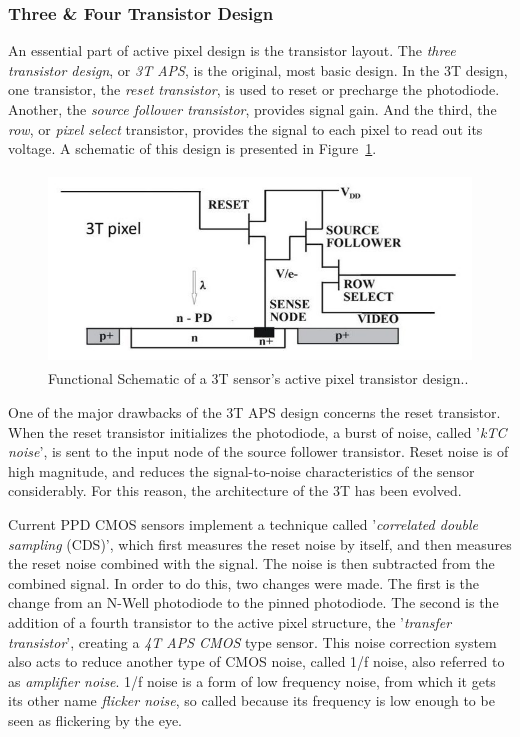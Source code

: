 \documentclass[10pt]{article}
\begin{document}
\subsubsection{Three \& Four Transistor Design}
\label{sec:3T4T}

An essential part of active pixel design is the transistor layout. The \emph{three transistor design}, or \emph{3T APS}, is the original, most basic design.  In the 3T design, one transistor, the \emph{reset transistor}, is used to reset or precharge the photodiode. Another, the \emph{source follower transistor}, provides signal gain. And the third, the \emph{row}, or \emph{pixel select} transistor, provides the signal to each pixel to read out its voltage. A schematic of this design is presented in Figure~\ref{fig:3TSchematic}.

\begin{figure}[!t]
    \centering
        \includegraphics[height=2in]{3T CMOS Design.png}
    \caption{Functional Schematic of a 3T sensor's active pixel transistor design.\cite{website:EDN0120}.}
    \label{fig:3TSchematic}
\end{figure}


One of the major drawbacks of the 3T APS design concerns the reset transistor. When the reset transistor initializes the photodiode, a burst of noise, called '\emph{kTC noise}', is sent to the input node of the source follower transistor. Reset noise is of high magnitude, and reduces the signal-to-noise characteristics of the sensor considerably. For this reason, the architecture of the 3T has been evolved.

Current PPD CMOS sensors implement a technique called '\emph{correlated double sampling} (CDS)', which first measures the reset noise by itself, and then measures the reset noise combined with the signal. The noise is then subtracted from the combined signal. In order to do this, two changes were made. The first is the change from an N-Well photodiode to the pinned photodiode. The second is the addition of a fourth transistor to the active pixel structure, the '\emph{transfer transistor}', creating a \emph{4T APS CMOS} type sensor. This noise correction system also acts to reduce another type of CMOS noise, called 1/f noise, also referred to as \emph{amplifier noise}. 1/f noise is a form of low frequency noise, from which it gets its other name \emph{flicker noise}, so called because its frequency is low enough to be seen as flickering by the eye.
\end{document}
